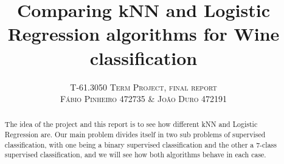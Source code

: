 \documentclass[twoside]{article}
\title{\vspace{-15mm}\fontsize{24pt}{10pt}\selectfont\textbf{Comparing kNN and Logistic Regression algorithms for Wine classification}}
\author{
\large
\textsc{T-61.3050 Term Project, final report}\\[2mm]
\textsc{F\'{a}bio Pinheiro 472735 \& Jo\~{a}o Duro 472191}\\[2mm]
\vspace{-5mm}
}
\date{}
\begin{document}
\maketitle %


\begin{abstract}
The idea of the project and this report is to see how different kNN and Logistic Regression are. Our main problem divides itself in two sub problems of supervised classification, with one being a binary supervised classification and the other a 7-class supervised classification, and we will see how both algorithms behave in each case.


\end{abstract}

\end{document}
